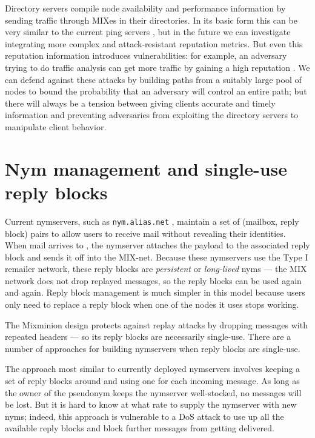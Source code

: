 \documentclass{llncs}
\newcommand\emailaddr{\begingroup \def\UrlLeft{<}\def\UrlRight{>}\urlstyle{tt}\Url}
\begin{document}
Directory servers compile node availability and performance information by
sending traffic through MIXes in their directories. In its basic form this
can be very similar to the current ping servers \cite{levien}, but in the
future we can investigate integrating more complex and attack-resistant
reputation metrics. But even this reputation information introduces
vulnerabilities: for example, an adversary trying to do traffic analysis
can get more traffic by gaining a high reputation \cite{mix-acc}. We can
defend against these attacks by building paths from a suitably large pool
of nodes \cite{casc-rep} to bound the probability that an adversary will
control an entire path; but there will always be a tension between giving
clients accurate and timely information and preventing adversaries from
exploiting the directory servers to manipulate client behavior.



\section{Nym management and single-use reply blocks}
\label{sec:nymservers}

Current nymservers, such as {\tt nym.alias.net} \cite{nym-alias-net},
maintain a set of (mailbox, reply block) pairs to allow users to
receive mail without revealing their identities. When mail arrives to
\emailaddr{bob@nym.alias.net}, the nymserver attaches the payload to
the associated
reply block and sends it off into the MIX-net. Because these nymservers
use the Type I remailer network, these reply blocks are \emph{persistent}
or \emph{long-lived} nyms --- the MIX network does not drop replayed
messages, so the reply blocks can be used again and again. Reply block
management is much simpler in this model because users only need to
replace a reply block when one of the nodes it uses stops working.

The Mixminion design protects against replay attacks by dropping
messages with repeated headers --- so its reply blocks are necessarily
single-use. There are a number of approaches for building nymservers
when reply blocks are single-use.

The approach most similar to currently deployed nymservers involves
keeping a set of reply blocks around and using one for each incoming
message. As long as the owner of the pseudonym keeps the nymserver
well-stocked, no messages will be lost. But it is hard to know at what
rate to supply the nymserver with new nyms; indeed, this approach is
vulnerable to a DoS attack to use up all the available reply blocks and
block further messages from getting delivered.
\end{document}
